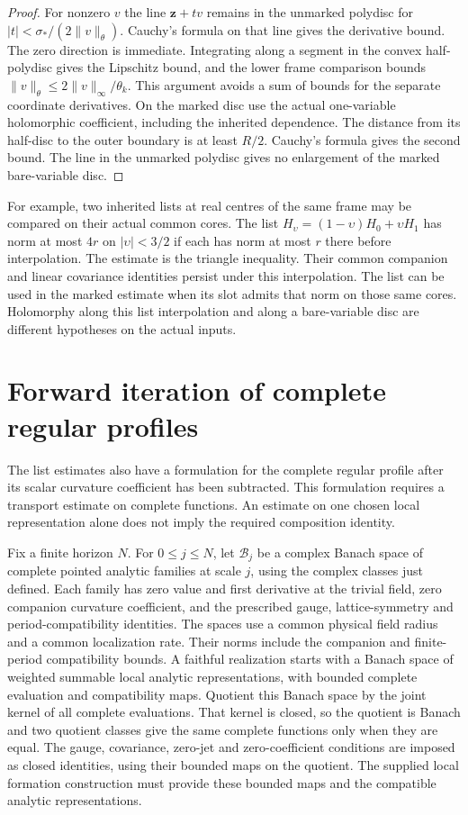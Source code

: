 \documentclass[11pt,letterpaper,reqno]{amsart}
\numberwithin{equation}{section}
\theoremstyle{definition}
\theoremstyle{remark}
\begin{document}
\begin{proof}
For nonzero $v$ the line $\mathbf z+t v$ remains in the unmarked
polydisc for $|t|<\sigma_*/(2\|v\|_\theta)$. Cauchy's formula on
that line gives the derivative bound. The zero direction is
immediate. Integrating along a segment in the convex half-polydisc
gives the Lipschitz bound, and the lower frame comparison bounds
$\|v\|_\theta\le 2\|v\|_\infty/\theta_k$. This argument avoids a
sum of bounds for the separate coordinate derivatives.
On the marked disc use the actual one-variable holomorphic
coefficient, including the inherited dependence. The distance
from its half-disc to the outer boundary is at least $R/2$.
Cauchy's formula gives the second bound. The line in the unmarked
polydisc gives no enlargement of the marked bare-variable disc.
\end{proof}

For example, two inherited lists at real centres of the same
frame may be compared on their actual common cores. The list
$H_\upsilon=(1-\upsilon)H_0+\upsilon H_1$ has norm at most $4r$
on $|\upsilon|<3/2$ if each has norm at most $r$ there before
interpolation. The estimate is the triangle inequality. Their
common companion and linear covariance identities persist under
this interpolation. The list can be used in the marked estimate
when its slot admits that norm on those same cores. Holomorphy
along this list interpolation and along a bare-variable disc are
different hypotheses on the actual inputs.

\section{Forward iteration of complete regular profiles}
\label{em:sec-profile}

The list estimates also have a formulation for the complete regular
profile after its scalar curvature coefficient has been subtracted.
This formulation requires a transport estimate on complete functions.
An estimate on one chosen local representation alone does not imply
the required composition identity.

Fix a finite horizon $N$. For $0\le j\le N$, let $\mathcal B_j$ be a
complex Banach space of complete pointed analytic families at scale
$j$, using the complex classes just defined. Each family has zero value and first derivative at the trivial
field, zero companion curvature coefficient, and the prescribed gauge,
lattice-symmetry and period-compatibility identities. The spaces use
a common physical field radius and a common localization rate.
Their norms include the companion and finite-period compatibility
bounds. A faithful realization starts with a Banach space of weighted
summable local analytic representations, with bounded complete
evaluation and compatibility maps. Quotient this Banach space by
the joint kernel of all complete evaluations. That kernel is closed,
so the quotient is Banach and two quotient classes give the same
complete functions only when they are equal. The gauge, covariance,
zero-jet and zero-coefficient conditions are imposed as closed
identities, using their bounded maps on the quotient. The supplied
local formation construction must provide these bounded maps and
the compatible analytic representations.
\end{document}
